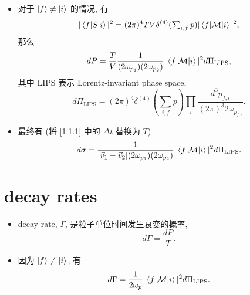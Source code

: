 \begin{itemize}
	\item 对于 $\ket{f} \neq \ket{i}$ 的情况, 有
	\begin{equation}
		|\braket{f | S | i}|^2 = (2 \pi)^4 T V \delta^{(4)}({\textstyle \sum_{i, f} p}) |\braket{f | \mathcal{M} | i}|^2,
	\end{equation}
	那么
	\begin{equation}
		dP = \frac{T}{V} \frac{1}{(2 \omega_{p_1}) (2 \omega_{p_2})} |\braket{f | \mathcal{M} | i}|^2 d\Pi_\text{LIPS},
	\end{equation}
	其中 LIPS 表示 Lorentz-invariant phase space,
	\begin{equation}
		d\Pi_\text{LIPS} = (2 \pi)^4 \delta^{(4)}({\textstyle \sum_{i, f} p}) \prod_i \frac{d^3 p_{f, i}}{(2 \pi)^3 2 \omega_{p_{f, i}}}.
	\end{equation}
	
	\item 最终有 (将 \eqref{1.1.1} 中的 $\Delta t$ 替换为 $T$)
	\begin{equation}
		d\sigma = \frac{1}{|\vec{v}_1 - \vec{v}_2| (2 \omega_{p_1}) (2 \omega_{p_2})} |\braket{f | \mathcal{M} | i}|^2 d\Pi_\text{LIPS}.
	\end{equation}
\end{itemize}

\section{decay rates}
\begin{itemize}
	\item decay rate, $\Gamma$, 是粒子单位时间发生衰变的概率,
	\begin{equation}
		d\Gamma = \frac{dP}{T}.
	\end{equation}
	
	\item 因为 $\ket{f} \neq \ket{i}$, 有
	\begin{equation}
		d\Gamma = \frac{1}{2 \omega_p} |\braket{f | \mathcal{M} | i}|^2 d\Pi_\text{LIPS}.
	\end{equation}
\end{itemize}
